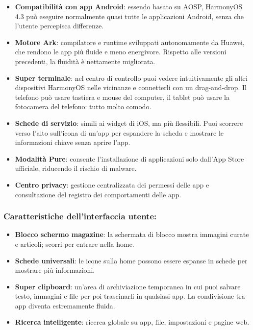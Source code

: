 \begin{itemize}
  \item \textbf{Compatibilità con app Android}: essendo basato su AOSP, HarmonyOS 4.3 può eseguire normalmente quasi tutte le applicazioni Android, senza che l'utente percepisca differenze.
  \item \textbf{Motore Ark}: compilatore e runtime sviluppati autonomamente da Huawei, che rendono le app più fluide e meno energivore. Rispetto alle versioni precedenti, la fluidità è nettamente migliorata.
  \item \textbf{Super terminale}: nel centro di controllo puoi vedere intuitivamente gli altri dispositivi HarmonyOS nelle vicinanze e connetterli con un drag-and-drop. Il telefono può usare tastiera e mouse del computer, il tablet può usare la fotocamera del telefono: tutto molto comodo.
  \item \textbf{Schede di servizio}: simili ai widget di iOS, ma più flessibili. Puoi scorrere verso l'alto sull'icona di un'app per espandere la scheda e mostrare le informazioni chiave senza aprire l'app.
  \item \textbf{Modalità Pure}: consente l'installazione di applicazioni solo dall'App Store ufficiale, riducendo il rischio di malware.
  \item \textbf{Centro privacy}: gestione centralizzata dei permessi delle app e consultazione del registro dei comportamenti delle app.
\end{itemize}

\subsubsection*{Caratteristiche dell'interfaccia utente:}

\begin{itemize}
  \item \textbf{Blocco schermo magazine}: la schermata di blocco mostra immagini curate e articoli; scorri per entrare nella home.
  \item \textbf{Schede universali}: le icone sulla home possono essere espanse in schede per mostrare più informazioni.
  \item \textbf{Super clipboard}: un'area di archiviazione temporanea in cui puoi salvare testo, immagini e file per poi trascinarli in qualsiasi app. La condivisione tra app diventa estremamente fluida.
  \item \textbf{Ricerca intelligente}: ricerca globale su app, file, impostazioni e pagine web.
\end{itemize}


